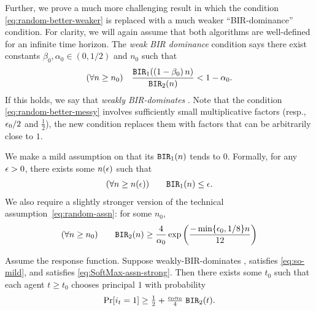 Further, we prove a much more challenging result in which the
condition \eqref{eq:random-better-weaker} is replaced with a much
weaker ``BIR-dominance'' condition. For clarity, we will again assume
that both algorithms are well-defined for an infinite time
horizon. The \emph{weak BIR dominance} condition says there exist
constants $\beta_0, \alpha_0\in (0, 1/2)$ and $n_0$ such that
 \begin{align}\label{eq:SoftMax-better}
   (\forall n\geq n_0) \quad
   \frac{\mathtt{BIR}_1((1-\beta_0)\, n)}{\mathtt{BIR}_2(n)} <1-\alpha_0.
 \end{align}
 If this holds, we say that \alg[1] \emph{weakly BIR-dominates}
 \alg[2]. Note that the condition \eqref{eq:random-better-messy}
 involves sufficiently small multiplicative factors (resp., $\epsilon_0/2$
 and $\tfrac12$), the new condition replaces them with factors that
 can be arbitrarily close to $1$.

 We make a mild assumption on \alg[1] that its $\mathtt{BIR}_1(n)$ tends to
 0. Formally, for any $\epsilon > 0$, there exists some $n(\epsilon)$ such
 that
 \begin{align}\label{eq:so-mild}
   (\forall n\geq n(\epsilon)) \qquad \mathtt{BIR}_1(n) \leq \epsilon.
 \end{align}
 We also require a slightly stronger version of the technical
 assumption~\eqref{eq:random-assn}:%
for some $n_0$,
\begin{align}\label{eq:SoftMax-assn-strong}
(\forall n\geq n_0) \qquad 
\mathtt{BIR}_2(n) \geq \frac{4}{\alpha_0} \exp \left( \frac{-\min\{\epsilon_0, 1/8\} n}{12}\right)
\end{align}




\begin{theorem}\label{thm:SoftMax-strong}
  Assume the \SoftMaxRandom response function. Suppose \alg[1]
  weakly-BIR-dominates \alg[2], \alg[1] satisfies \eqref{eq:so-mild},
  and \alg[2] satisfies \eqref{eq:SoftMax-assn-strong}. Then there
  exists some $t_0$ such that each agent $t\geq t_0$ chooses principal
  $1$ with probability
\begin{align}\label{eq:thm:SoftMax-strong}
     \Pr[i_t = 1]\geq \tfrac12 +  \tfrac{c_0\alpha_0}{4}\; \mathtt{BIR}_2(t).
\end{align}
\end{theorem}




